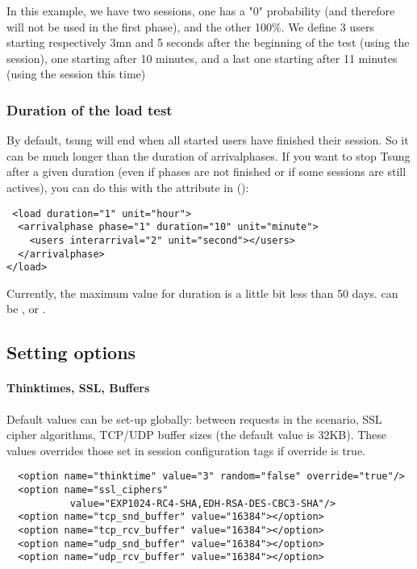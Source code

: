 \documentclass{TSUNG-en}
\begin{document}
In this example, we have two sessions, one has a "0" probability (and
therefore will not be used in the first phase), and the other
100\%. We define 3 users starting respectively 3mn and 5 seconds
after the beginning of the test (using the 
session), one starting after 10 minutes, and a last one starting after
11 minutes (using the  session this time)

\subsubsection{Duration of the load test}

By default, tsung will end when all started users have finished their
session. So it can be much longer than the duration of
arrivalphases. If you want to stop Tsung  after a given duration
(even if phases are not finished or if some sessions are still actives),
you can do this with the  attribute in
 ():

\begin{Verbatim}
 <load duration="1" unit="hour">
  <arrivalphase phase="1" duration="10" unit="minute">
    <users interarrival="2" unit="second"></users>
  </arrivalphase>
</load>
\end{Verbatim}

Currently, the maximum value for duration is a little bit less than 50
days.  can be ,  or
.


\subsection{Setting options}
\label{sec:options}

\paragraph{Thinktimes, SSL, Buffers}
\par Default values can be set-up globally:  between requests
in the scenario,  SSL cipher algorithms, TCP/UDP buffer sizes (the default
value is 32KB). These values overrides
those set in session configuration tags if override is true.
\begin{Verbatim}
  <option name="thinktime" value="3" random="false" override="true"/>
  <option name="ssl_ciphers"
           value="EXP1024-RC4-SHA,EDH-RSA-DES-CBC3-SHA"/>
  <option name="tcp_snd_buffer" value="16384"></option>
  <option name="tcp_rcv_buffer" value="16384"></option>
  <option name="udp_snd_buffer" value="16384"></option>
  <option name="udp_rcv_buffer" value="16384"></option>
\end{Verbatim}
\end{document}
